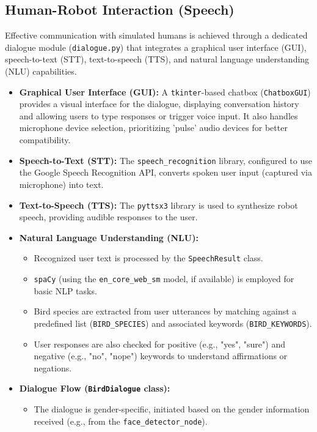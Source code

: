 \documentclass[a4paper]{article}
\begin{document}
\subsection{Human-Robot Interaction (Speech)}
Effective communication with simulated humans is achieved through a dedicated dialogue module (\texttt{dialogue.py}) that integrates a graphical user interface (GUI), speech-to-text (STT), text-to-speech (TTS), and natural language understanding (NLU) capabilities.
\begin{itemize}
    \item \textbf{Graphical User Interface (GUI):} A \texttt{tkinter}-based chatbox (\texttt{ChatboxGUI}) provides a visual interface for the dialogue, displaying conversation history and allowing users to type responses or trigger voice input. It also handles microphone device selection, prioritizing 'pulse' audio devices for better compatibility.
    \item \textbf{Speech-to-Text (STT):} The \texttt{speech\_recognition} library, configured to use the Google Speech Recognition API, converts spoken user input (captured via microphone) into text.
    \item \textbf{Text-to-Speech (TTS):} The \texttt{pyttsx3} library is used to synthesize robot speech, providing audible responses to the user.
    \item \textbf{Natural Language Understanding (NLU):}
        \begin{itemize}
            \item Recognized user text is processed by the \texttt{SpeechResult} class.
            \item \texttt{spaCy} (using the \texttt{en\_core\_web\_sm} model, if available) is employed for basic NLP tasks.
            \item Bird species are extracted from user utterances by matching against a predefined list (\texttt{BIRD\_SPECIES}) and associated keywords (\texttt{BIRD\_KEYWORDS}).
            \item User responses are also checked for positive (e.g., "yes", "sure") and negative (e.g., "no", "nope") keywords to understand affirmations or negations.
        \end{itemize}
    \item \textbf{Dialogue Flow (\texttt{BirdDialogue} class):}
        \begin{itemize}
            \item The dialogue is gender-specific, initiated based on the gender information received (e.g., from the \texttt{face\_detector\_node}).

\end{itemize}
\end{itemize}
\end{document}
